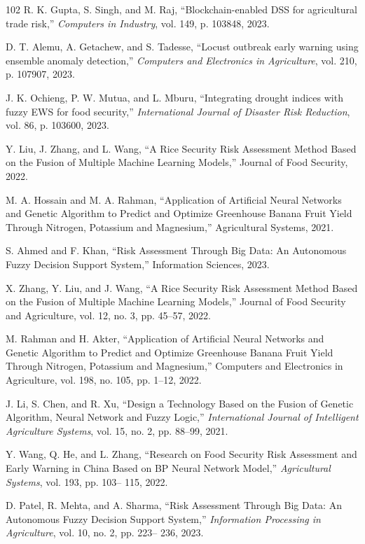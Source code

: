 \documentclass[preprint,12pt]{elsarticle}
\begin{document}
\begin{thebibliography}{102}
		R. K. Gupta, S. Singh, and M. Raj, ``Blockchain-enabled DSS for agricultural trade risk,'' \emph{Computers in Industry}, vol. 149, p. 103848, 2023.
		
		D. T. Alemu, A. Getachew, and S. Tadesse, ``Locust outbreak early warning using ensemble anomaly detection,'' \emph{Computers and Electronics in Agriculture}, vol. 210, p. 107907, 2023.
		
		J. K. Ochieng, P. W. Mutua, and L. Mburu, ``Integrating drought indices with fuzzy EWS for food security,'' \emph{International Journal of Disaster Risk Reduction}, vol. 86, p. 103600, 2023.
		
		Y. Liu, J. Zhang, and L. Wang, ``A Rice Security Risk Assessment Method Based on the Fusion of Multiple Machine Learning Models,'' Journal of Food Security, 2022.
		
		M. A. Hossain and M. A. Rahman, ``Application of Artificial Neural Networks and Genetic Algorithm to Predict and Optimize Greenhouse Banana Fruit Yield Through Nitrogen, Potassium and Magnesium,'' Agricultural Systems, 2021.
		
		S. Ahmed and F. Khan, ``Risk Assessment Through Big Data: An Autonomous Fuzzy Decision Support System,'' Information Sciences, 2023.
		
		X. Zhang, Y. Liu, and J. Wang, ``A Rice Security Risk Assessment Method Based on the Fusion of Multiple Machine Learning Models,'' Journal of Food Security and Agriculture, vol. 12, no. 3, pp. 45--57, 2022.
		
		M. Rahman and H. Akter, ``Application of Artificial Neural Networks and Genetic Algorithm to Predict and Optimize Greenhouse Banana Fruit Yield Through Nitrogen, Potassium and Magnesium,'' Computers and Electronics in Agriculture, vol. 198, no. 105, pp. 1--12, 2022.
		
		J. Li, S. Chen, and R. Xu, ``Design a Technology Based on the Fusion of Genetic Algorithm, Neural Network and Fuzzy Logic,'' \emph{International Journal of Intelligent Agriculture Systems}, vol. 15, no. 2, pp. 88--99, 2021.
		
		Y. Wang, Q. He, and L. Zhang, ``Research on Food Security Risk Assessment and Early Warning in China Based on BP Neural Network Model,'' \emph{Agricultural Systems}, vol. 193, pp. 103-- 115, 2022.
		
		D. Patel, R. Mehta, and A. Sharma, ``Risk Assessment Through Big Data: An Autonomous Fuzzy Decision Support System,'' \emph{Information Processing in Agriculture}, vol. 10, no. 2, pp. 223-- 236, 2023.
		

\end{thebibliography}
\end{document}
